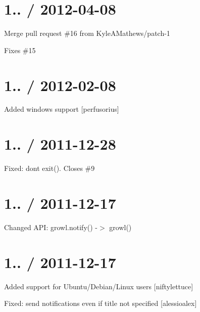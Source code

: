 \section*{1.. / 2012-\/04-\/08 }


\begin{DoxyItemize}
\item Merge pull request \#16 from Kyle\+A\+Mathews/patch-\/1
\item Fixes \#15
\end{DoxyItemize}

\section*{1.. / 2012-\/02-\/08 }


\begin{DoxyItemize}
\item Added windows support \mbox{[}perfusorius\mbox{]}
\end{DoxyItemize}

\section*{1.. / 2011-\/12-\/28 }


\begin{DoxyItemize}
\item Fixed\+: dont exit(). Closes \#9
\end{DoxyItemize}

\section*{1.. / 2011-\/12-\/17 }


\begin{DoxyItemize}
\item Changed A\+PI\+: {\ttfamily growl.\+notify()} -\/$>$ {\ttfamily growl()}
\end{DoxyItemize}

\section*{1.. / 2011-\/12-\/17 }


\begin{DoxyItemize}
\item Added support for Ubuntu/\+Debian/\+Linux users \mbox{[}niftylettuce\mbox{]}
\item Fixed\+: send notifications even if title not specified \mbox{[}alessioalex\mbox{]}
\end{DoxyItemize}

